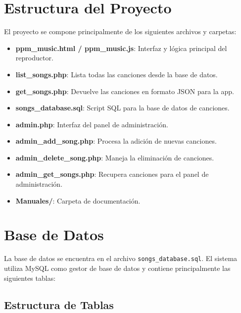 \documentclass[a4paper,12pt]{article}
\begin{document}
\section{Estructura del Proyecto}
El proyecto se compone principalmente de los siguientes archivos y carpetas:
\begin{itemize}
    \item \textbf{ppm\_music.html / ppm\_music.js}: Interfaz y lógica principal del reproductor.
    \item \textbf{list\_songs.php}: Lista todas las canciones desde la base de datos.
    \item \textbf{get\_songs.php}: Devuelve las canciones en formato JSON para la app.
    \item \textbf{songs\_database.sql}: Script SQL para la base de datos de canciones.
    \item \textbf{admin.php}: Interfaz del panel de administración.
    \item \textbf{admin\_add\_song.php}: Procesa la adición de nuevas canciones.
    \item \textbf{admin\_delete\_song.php}: Maneja la eliminación de canciones.
    \item \textbf{admin\_get\_songs.php}: Recupera canciones para el panel de administración.
    \item \textbf{Manuales/}: Carpeta de documentación.
\end{itemize}

\section{Base de Datos}

La base de datos se encuentra en el archivo \texttt{songs\_database.sql}. El sistema utiliza MySQL como gestor de base de datos y contiene principalmente las siguientes tablas:

\subsection{Estructura de Tablas}
\end{document}
